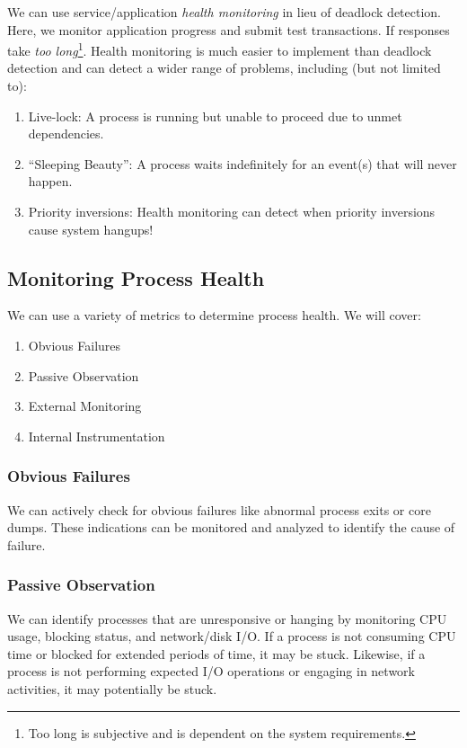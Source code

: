 \documentclass{report}
\begin{document}
We can use service/application \textit{health monitoring} in lieu of deadlock detection. Here, we
monitor application progress and submit test transactions. If responses take \textit{too
  long}\footnote{Too long is subjective and is dependent on the system requirements.}. Health
monitoring is much easier to implement than deadlock detection and can detect a wider range of
problems, including (but not limited to):

\begin{enumerate}[label=\textit{(\roman*)}]
\item Live-lock: A process is running but unable to proceed due to unmet dependencies.
\item ``Sleeping Beauty'': A process waits indefinitely for an event(s) that will never happen.
\item Priority inversions: Health monitoring can detect when priority inversions cause system
  hangups!
\end{enumerate}


\subsection{Monitoring Process Health}
We can use a variety of metrics to determine process health. We will cover:
\begin{enumerate}[label=\textit{(\roman*)}]
\item Obvious Failures
\item Passive Observation
\item External Monitoring
\item Internal Instrumentation
\end{enumerate}


\subsubsection{Obvious Failures}
We can actively check for obvious failures like abnormal process exits or core dumps. These
indications can be monitored and analyzed to identify the cause of failure.


\subsubsection{Passive Observation}
We can identify processes that are unresponsive or hanging by monitoring CPU usage, blocking status,
and network/disk I/O. If a process is not consuming CPU time or blocked for extended periods of time, it may be
stuck. Likewise, if a process is not performing expected I/O operations or engaging in network
activities, it may potentially be stuck.
\end{document}
